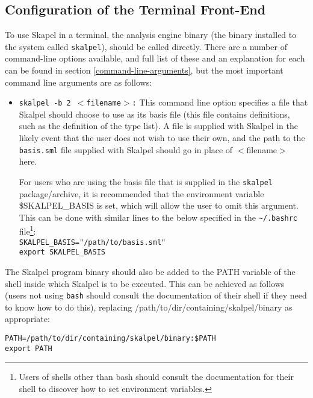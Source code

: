 \documentclass{report}
\begin{document}
\subsection{Configuration of the Terminal Front-End}
\label{skalpel-environment-vars}

To use Skapel in a terminal, the analysis engine binary (the binary
installed to the system called \texttt{skalpel}), should be called
directly. There are a number of command-line options available, and
full list of these and an explanation for each can be found in section
\ref{command-line-arguments}, but the most important command line
arguments are as follows:

\begin{itemize}
\item \texttt{skalpel -b 2 $<$filename$>$:} This command line option
  specifies a file that Skalpel should choose to use as its
  basis file (this file contains definitions, such as the definition of the
  type list). A file is supplied with Skalpel in the likely event that the
  user does not wish to use their own, and the path to the
  \texttt{basis.sml} file supplied with Skalpel should go in place of
  $<$filename$>$ here.

  For users who are using the basis file that is supplied in the
  \texttt{skalpel} package/archive, it is recommended that the
  environment variable \$SKALPEL\_BASIS is set, which will allow the
  user to omit this argument. This can be done with similar lines to
  the below specified in the \texttt{{\textasciitilde}/.bashrc} file\footnote{ Users of shells
    other than bash should consult the documentation for their shell
    to discover how to set environment variables.}:\\

  \texttt{SKALPEL\_BASIS="/path/to/basis.sml"}\\
  \texttt{export SKALPEL\_BASIS}

\end{itemize}

The Skalpel program binary should also be added to the PATH variable
of the shell inside which Skalpel is to be executed. This can be
achieved as follows (users not using \texttt{bash} should consult the
documentation of their shell if they need to know how to do this),
replacing /path/to/dir/containing/skalpel/binary as appropriate:

\noindent \texttt{PATH=/path/to/dir/containing/skalpel/binary:\$PATH}\\
\texttt{export PATH}
\end{document}

